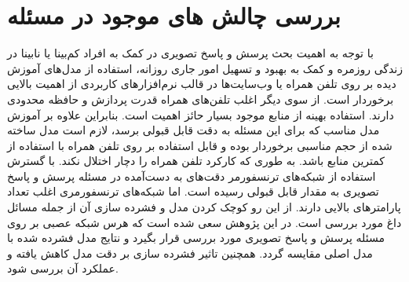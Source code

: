 \section{بررسی چالش های موجود در مسئله}
با توجه به اهمیت بحث پرسش و پاسخ تصویری در کمک به افراد کم‌بینا یا نابینا در زندگی روزمره و کمک به بهبود و تسهیل امور جاری روزانه، استفاده از مدل‌های آموزش دیده بر روی تلفن همراه یا وب‌سایت‌ها در قالب نرم‌افزار‌های کاربردی از اهمیت بالایی برخوردار است. از سوی دیگر اغلب تلفن‌های همراه قدرت پردازش و حافظه محدودی دارند. استفاده بهینه از منابع موجود بسیار حائز اهمیت است. بنابراین علاوه بر آموزش مدل مناسب که برای این مسئله به دقت قابل قبولی برسد، لازم است مدل ساخته شده از حجم مناسبی برخوردار بوده و قابل استفاده بر روی تلفن همراه با استفاده از کمترین منابع باشد. به طوری که کارکرد تلفن همراه را دچار اختلال نکند. 
\newline	 
با گسترش استفاده از شبکه‌های ترنسفورمر دقت‌های به دست‌آمده در مسئله پرسش و پاسخ تصویری به مقدار قابل قبولی رسیده است. اما شبکه‌های ترنسفورمری اغلب تعداد پارامتر‌های بالایی دارند. از این رو کوچک کردن مدل و فشرده سازی آن از جمله مسائل داغ مورد بررسی است.
در این پژوهش سعی شده است که هرس شبکه عصبی بر روی مسئله پرسش و پاسخ تصویری مورد بررسی قرار بگیرد و نتایج مدل فشرده شده با مدل اصلی مقایسه گردد. همچنین تاثیر فشرده سازی بر دقت مدل کاهش یافته و عملکرد آن بررسی ‌شود.

